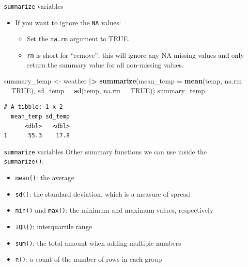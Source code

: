 \documentclass[
  ignorenonframetext,
]{beamer}
\newenvironment{Shaded}{\begin{snugshade}}{\end{snugshade}}
\newcommand{\AttributeTok}[1]{\textcolor[rgb]{0.13,0.29,0.53}{#1}}
\newcommand{\ConstantTok}[1]{\textcolor[rgb]{0.56,0.35,0.01}{#1}}
\newcommand{\FunctionTok}[1]{\textcolor[rgb]{0.13,0.29,0.53}{\textbf{#1}}}
\newcommand{\NormalTok}[1]{#1}
\newcommand{\OtherTok}[1]{\textcolor[rgb]{0.56,0.35,0.01}{#1}}
\newcommand{\SpecialCharTok}[1]{\textcolor[rgb]{0.81,0.36,0.00}{\textbf{#1}}}
\providecommand{\tightlist}{%
  \setlength{\itemsep}{0pt}\setlength{\parskip}{0pt}}
\begin{document}
\begin{frame}[fragile]{\texttt{summarize} variables}
\protect\hypertarget{summarize-variables-2}{}
\begin{itemize}
\item
  If you want to ignore the \texttt{NA} values:

  \begin{itemize}
  \tightlist
  \item
    Set the \texttt{na.rm} argument to TRUE.
  \item
    \texttt{rm} is short for ``remove''; this will ignore any NA missing
    values and only return the summary value for all non-missing values.
  \end{itemize}
\end{itemize}

\normalsize

\begin{Shaded}
\begin{Highlighting}[]
\NormalTok{summary\_temp }\OtherTok{\textless{}{-}}\NormalTok{ weather }\SpecialCharTok{|\textgreater{}} 
  \FunctionTok{summarize}\NormalTok{(}\AttributeTok{mean\_temp =} \FunctionTok{mean}\NormalTok{(temp, }\AttributeTok{na.rm =} \ConstantTok{TRUE}\NormalTok{), }
            \AttributeTok{sd\_temp =} \FunctionTok{sd}\NormalTok{(temp, }\AttributeTok{na.rm =} \ConstantTok{TRUE}\NormalTok{))}
\NormalTok{summary\_temp}
\end{Highlighting}
\end{Shaded}

\begin{verbatim}
# A tibble: 1 x 2
  mean_temp sd_temp
      <dbl>   <dbl>
1      55.3    17.8
\end{verbatim}

\normalsize
\end{frame}

\begin{frame}[fragile]{\texttt{summarize} variables}
\protect\hypertarget{summarize-variables-3}{}
Other summary functions we can use inside the \texttt{summarize()}:

\begin{itemize}
\tightlist
\item
  \texttt{mean()}: the average
\item
  \texttt{sd()}: the standard deviation, which is a measure of spread
\item
  \texttt{min()} and \texttt{max()}: the minimum and maximum values,
  respectively
\item
  \texttt{IQR()}: interquartile range
\item
  \texttt{sum()}: the total amount when adding multiple numbers
\item
  \texttt{n()}: a count of the number of rows in each group
\end{itemize}
\end{frame}
\end{document}

